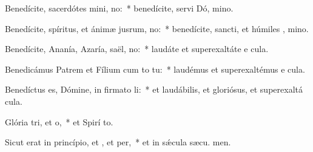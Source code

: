 \item Benedícite, sacerdótes mini, no:~* benedícite, servi Dó, mino.
\item Benedícite, spíritus, et ánimæ jusrum, no:~* benedícite, sancti, et húmiles , mino.
\item Benedícite, Ananía, Azaría, saël, no:~* laudáte et superexaltáte e  cula.
\item Benedicámus Patrem et Fílium cum to tu:~* laudémus et superexaltémus e  cula.
\item Benedíctus es, Dómine, in firmato li:~* et laudábilis, et gloriósus, et superexaltá  cula.
\item Glória tri, et o,~* et Spirí to.
\item Sicut erat in princípio, et , et per,~* et in sǽcula sæcu. men.
